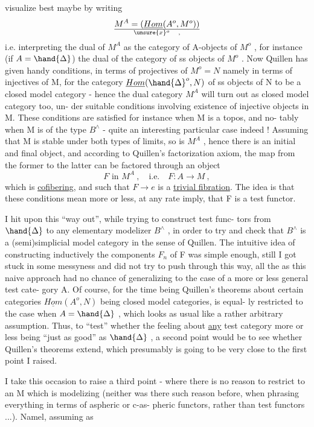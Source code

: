 
visualize best maybe by writing
\[ M^{A} = (\underline{Hom}(A^{o},M^{o}))\over{\unsure{x}}{^{o}} \quad , \]
i.e. interpreting the dual of $M^{A}$ as the category of A-objects of $M^{o}$ ,
for instance (if $A = \hand{\Delta}$)  the  dual of the category of ss objects of
$M^{o}$ . Now Quillen has given handy conditions, in terms of projectives
of $M^{o} = N$ namely in terms of injectives of M, for the category
$\underline{Hom}(\hand{\Delta}^{o},N)$ of ss objects of N to be a closed model category - hence
the dual category $M^{A}$ will turn out as  closed model category too, un-%
der suitable conditions involving existence of injective objects in M.
These conditions are satisfied for instance when M is a topos, and no-%
tably when M is of the type $B^{\wedge}$ - quite an interesting particular case
indeed ! Assuming that M is stable under both types of limits, so is
$M^{A}$ , hence there is an initial and final object, and according to
Quillen's factorization axiom, the  map from the former to
the latter can be factored through an object
\[ F \text{ in } M^{A} \ , \quad \text{i.e.} \quad F \colon A \longrightarrow M \ , \]
which is \uline{cofibering}, and such that $F \longrightarrow e$ is a \uline{trivial fibration}.
The idea is that these conditions mean more or less, at any rate imply,
that F is a test functor.

I hit upon this ``way out'', while trying to construct test func-%
tors from $\hand{\Delta}$ to any elementary modelizer $B^{\wedge}$ , in order to try and check
that $B^{\wedge}$ is a (semi)simplicial model category in the sense of Quillen.
The intuitive idea of constructing inductively the components $F_{n}$ of F
was simple enough, still I got stuck in some messyness and did not try
to push through this way, all the  as this naive approach had no
chance of generalizing to the case of a more or less general test cate-%
gory A. Of course, for the time being Quillen's theorems\hand{,} about
certain categories $\underline{Hom}(A^{o},N)$ being closed model categories, is equal-%
ly restricted to the case when $A = \hand{\Delta}$ , which looks as usual like a
rather arbitrary assumption. Thus, to ``test'' whether the feeling 
about \uline{any} test category more or less being ``just as good'' as $\hand{\Delta}$ , a
second point would be to see whether Quillen's theorems extend, which
presumably is going to be very close to the first point I raised.

I take this occasion to raise a third point - where there is no
reason to restrict to an M which is modelizing (neither was there such
reason before, when phrasing everything in terms of aspheric or c-as-%
pheric functors, rather than test functors ...). Namel, assuming as

